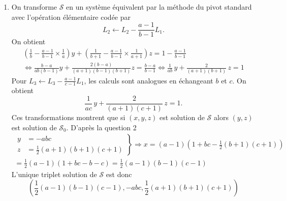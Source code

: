 \begin{enumerate}
  \item On transforme $\mathcal{S}$ en un système équivalent par la méthode du pivot standard avec l'opération élémentaire codée par
\[
L_2 \longleftarrow L_2 -\frac{a-1}{b-1}L_1 .
\]
On obtient
\begin{multline*}
  \left(\frac{1}{b}-\frac{a-1}{b-1}\times\frac{1}{a} \right)y 
 +\left(\frac{1}{b+1}-\frac{a-1}{b-1}\times\frac{1}{a+1} \right)z
 = 1-\frac{a-1}{b-1} \\
 \Leftrightarrow
 \frac{b-a}{ab(b-1)}y + \frac{2(b-a)}{(a+1)(b-1)(b+1)}z = \frac{b-a}{b-1}
 \Leftrightarrow
\frac{1}{ab}\,y + \frac{2}{(a+1)(b+1)}\,z = 1 
\end{multline*}
Pour  $L_3 \leftarrow L_3-\frac{a-1}{c-1}L_1$, les calculs sont analogues en échangeant $b$ et $c$. On obtient
\begin{displaymath}
\frac{1}{ac}\,y + \frac{2}{(a+1)(c+1)}\,z = 1.
\end{displaymath}
Ces transformations montrent que si $(x,y,z)$ est solution de $\mathcal{S}$ alors $(y,z)$ est solution de $\mathcal{S}_0$. D'après la question 2
\begin{multline*}
\left. 
\begin{aligned}
y &= -abc \\ z &= \frac{1}{2}(a+1)(b+1)(c+1)  
\end{aligned}
\right\rbrace   
\Rightarrow
x = (a-1)\left(1+bc -\frac{1}{2}(b+1)(c+1) \right) \\
= \frac{1}{2}(a-1)(1+bc-b-c)=\frac{1}{2}(a-1)(b-1)(c-1)
\end{multline*}
L'unique triplet solution de $\mathcal{S}$ est donc
\begin{displaymath}
  \left( \frac{1}{2}(a-1)(b-1)(c-1), -abc, \frac{1}{2}(a+1)(b+1)(c+1)\right) 
\end{displaymath}


  
\end{enumerate}
